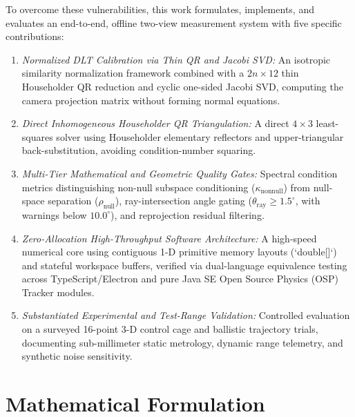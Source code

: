 \documentclass[a4paper,conference]{IEEEtran}
\begin{document}
To overcome these vulnerabilities, this work formulates, implements, and evaluates an end-to-end, offline two-view measurement system with five specific contributions:
\begin{enumerate}
  \item \textit{Normalized DLT Calibration via Thin QR and Jacobi SVD:} An isotropic similarity normalization framework combined with a $2n \times 12$ thin Householder QR reduction and cyclic one-sided Jacobi SVD, computing the camera projection matrix without forming normal equations.
  \item \textit{Direct Inhomogeneous Householder QR Triangulation:} A direct $4 \times 3$ least-squares solver using Householder elementary reflectors and upper-triangular back-substitution, avoiding condition-number squaring.
  \item \textit{Multi-Tier Mathematical and Geometric Quality Gates:} Spectral condition metrics distinguishing non-null subspace conditioning ($\kappa_{\mathrm{nonnull}}$) from null-space separation ($\rho_{\mathrm{null}}$), ray-intersection angle gating ($\theta_{\mathrm{ray}} \ge 1.5^\circ$, with warnings below $10.0^\circ$), and reprojection residual filtering.
  \item \textit{Zero-Allocation High-Throughput Software Architecture:} A high-speed numerical core using contiguous 1-D primitive memory layouts (`double[]`) and stateful workspace buffers, verified via dual-language equivalence testing across TypeScript/Electron and pure Java SE Open Source Physics (OSP) Tracker modules.
  \item \textit{Substantiated Experimental and Test-Range Validation:} Controlled evaluation on a surveyed 16-point 3-D control cage and ballistic trajectory trials, documenting sub-millimeter static metrology, dynamic range telemetry, and synthetic noise sensitivity.
\end{enumerate}

\section{Mathematical Formulation}
\end{document}
